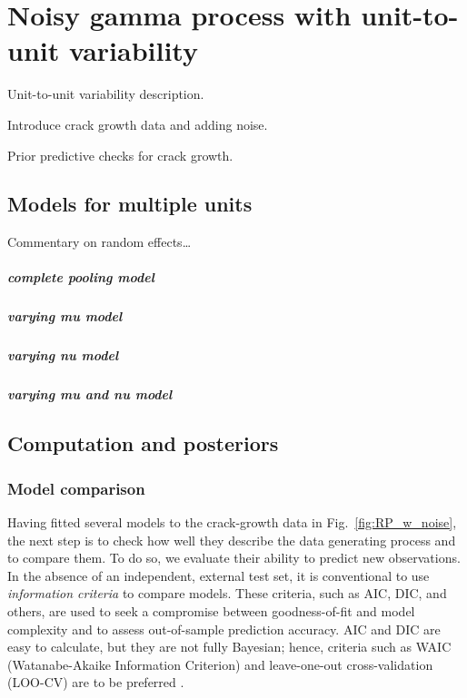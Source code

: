 \chapter{Noisy gamma process with unit-to-unit variability}\label{chap:chapter5}

Unit-to-unit variability description.

Introduce crack growth data and adding noise.

Prior predictive checks for crack growth.

\section{Models for multiple units}

Commentary on random effects\ldots

\paragraph{complete pooling model}

\paragraph{varying mu model}

\paragraph{varying nu model}

\paragraph{varying mu and nu model}

\section{Computation and posteriors}

\subsection{Model comparison}
\label{subsec:modcomp}

Having fitted several models to the crack-growth data in Fig.~\ref{fig:RP_w_noise}, the next step is to check how well they describe the data generating process and to compare them. To do so, we evaluate their ability to predict new observations. In the absence of an independent, external test set, it is conventional to use \textit{information criteria} to compare models. These criteria, such as AIC, DIC, and others, are used to seek a compromise between goodness-of-fit and model complexity and to assess out-of-sample prediction accuracy. AIC and DIC are easy to calculate, but they are not fully Bayesian; hence, criteria such as WAIC (Watanabe-Akaike Information Criterion) and leave-one-out cross-validation (LOO-CV) are to be preferred \citep{Vehtari2017}.

